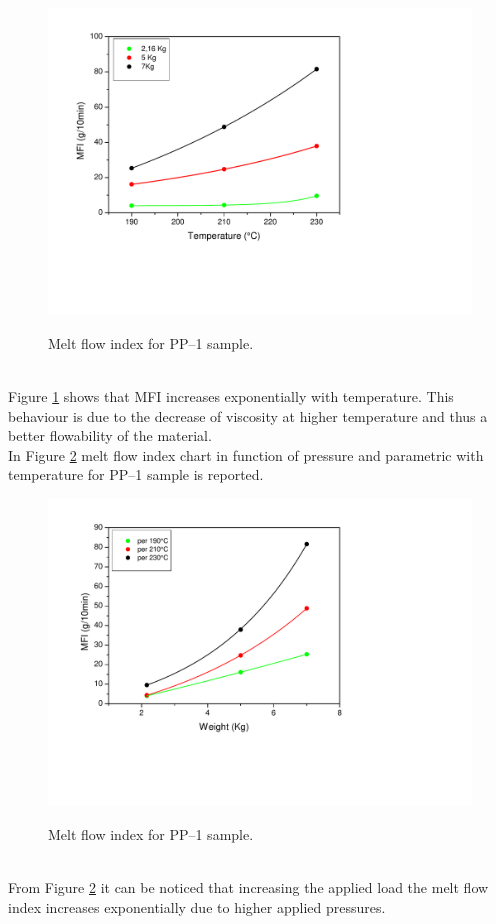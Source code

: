 \documentclass[a4paper, 11pt]{article}
\begin{document}
\begin{figure}[h!]
	\centering
	{\includegraphics[scale=0.4]{mfi}}
	\captionsetup{justification=centering}
	\caption{Melt flow index for PP–1 sample.}
	\label{fig:mfi}
\end{figure}\\
Figure \ref{fig:mfi} shows that MFI increases exponentially with temperature. This behaviour is due to the decrease of viscosity at higher temperature and thus a better flowability of the material.\\
In Figure \ref{fig:mfi2} melt flow index chart in function of pressure and parametric with temperature for PP–1 sample is reported.
\begin{figure}[h!]
	\centering
	{\includegraphics[scale=0.4]{mfi2}}
	\captionsetup{justification=centering}
	\caption{Melt flow index for PP–1 sample.}
	\label{fig:mfi2}
\end{figure}\\
From Figure \ref{fig:mfi2} it can be noticed that increasing the applied load the melt flow index increases exponentially due to higher applied pressures.
\end{document}
